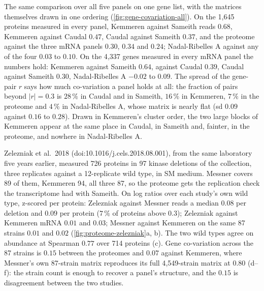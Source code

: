  The same comparison over all five panels on
one gene list, with the matrices themselves drawn in one ordering
(\cref{fig:gene-covariation-all}). On the 1{,}645 proteins measured in every panel,
Kemmeren against Sameith reads $0.68$, Kemmeren against Caudal $0.47$, Caudal against
Sameith $0.37$, and the proteome against the three mRNA panels $0.30$, $0.34$ and
$0.24$; Nadal-Ribelles A against any of the four $0.03$ to $0.10$. On the 4{,}337 genes
measured in every mRNA panel the numbers hold: Kemmeren against Sameith $0.64$, against
Caudal $0.39$, Caudal against Sameith $0.30$, Nadal-Ribelles A $-0.02$ to $0.09$. The
spread of the gene-pair $r$ says how much co-variation a panel holds at all: the
fraction of pairs beyond $|r| = 0.3$ is $28\,\%$ in Caudal and in Sameith, $16\,\%$ in
Kemmeren, $7\,\%$ in the proteome and $4\,\%$ in Nadal-Ribelles A, whose matrix is
nearly flat (sd $0.09$ against $0.16$ to $0.28$). Drawn in Kemmeren's cluster order,
the two large blocks of Kemmeren appear at the same place in Caudal, in Sameith and,
fainter, in the proteome, and nowhere in Nadal-Ribelles A.

 Zelezniak et al.\ 2018 (doi:10.1016/j.cels.2018.08.001),
from the same laboratory five years earlier, measured 726 proteins in 97 kinase deletions
of the collection, three replicates against a 12-replicate wild type, in SM medium.
Messner covers 89 of them, Kemmeren 94, all three 87, so the proteome gets the
replication check the transcriptome had with Sameith. On log ratios over each study's
own wild type, z-scored per protein: Zelezniak against Messner reads a median $0.08$ per
deletion and $0.09$ per protein ($7\,\%$ of proteins above $0.3$); Zelezniak against
Kemmeren mRNA $0.01$ and $0.03$; Messner against Kemmeren on the same 87 strains $0.01$
and $0.02$ (\cref{fig:proteome-zelezniak}a, b). The two wild types agree on abundance at
Spearman $0.77$ over 714 proteins (c). Gene co-variation across the 87 strains is
$0.15$ between the proteomes and $0.07$ against Kemmeren, where Messner's own 87-strain
matrix reproduces its full 4{,}549-strain matrix at $0.80$ (d--f): the strain count is
enough to recover a panel's structure, and the $0.15$ is disagreement between the two
studies.

